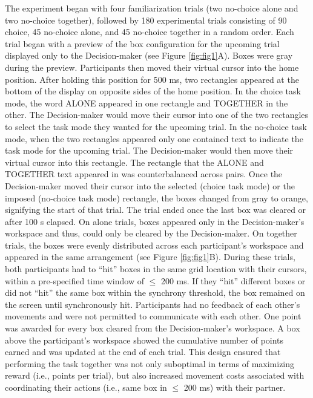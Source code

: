 \documentclass[
  man,
  floatsintext,
  longtable,
  nolmodern,
  notxfonts,
  notimes,
  colorlinks=true,linkcolor=blue,citecolor=blue,urlcolor=blue]{apa7}
\begin{document}
The experiment began with four familiarization trials (two no-choice
alone and two no-choice together), followed by 180 experimental trials
consisting of 90 choice, 45 no-choice alone, and 45 no-choice together
in a random order. Each trial began with a preview of the box
configuration for the upcoming trial displayed only to the
Decision-maker (see Figure \ref{fig:fig1}A). Boxes were gray during the
preview. Participants then moved their virtual cursor into the home
position. After holding this position for 500 ms, two rectangles
appeared at the bottom of the display on opposite sides of the home
position. In the choice task mode, the word ALONE appeared in one
rectangle and TOGETHER in the other. The Decision-maker would move their
cursor into one of the two rectangles to select the task mode they
wanted for the upcoming trial. In the no-choice task mode, when the two
rectangles appeared only one contained text to indicate the task mode
for the upcoming trial. The Decision-maker would then move their virtual
cursor into this rectangle. The rectangle that the ALONE and TOGETHER
text appeared in was counterbalanced across pairs. Once the
Decision-maker moved their cursor into the selected (choice task mode)
or the imposed (no-choice task mode) rectangle, the boxes changed from
gray to orange, signifying the start of that trial. The trial ended once
the last box was cleared or after 100 s elapsed. On alone trials, boxes
appeared only in the Decision-maker's workspace and thus, could only be
cleared by the Decision-maker. On together trials, the boxes were evenly
distributed across each participant's workspace and appeared in the same
arrangement (see Figure \ref{fig:fig1}B). During these trials, both
participants had to ``hit'' boxes in the same grid location with their
cursors, within a pre-specified time window of \(\leq\) 200 ms. If they
``hit'' different boxes or did not ``hit'' the same box within the
synchrony threshold, the box remained on the screen until synchronously
hit. Participants had no feedback of each other's movements and were not
permitted to communicate with each other. One point was awarded for
every box cleared from the Decision-maker's workspace. A box above the
participant's workspace showed the cumulative number of points earned
and was updated at the end of each trial. This design ensured that
performing the task together was not only suboptimal in terms of
maximizing reward (i.e., points per trial), but also increased movement
costs associated with coordinating their actions (i.e., same box in
\(\leq\) 200 ms) with their partner.
\end{document}
